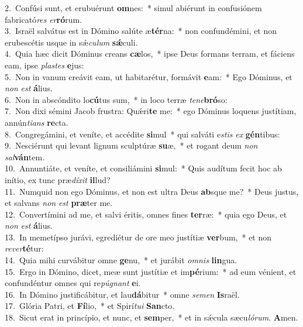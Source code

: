 {2.~}Confúsi sunt, et erubuérunt \textbf{om}nes:~* simul abiérunt in confusiónem fabricató\textit{res} \textit{er}\textbf{ró}rum.\\
{3.~}Israël salvátus est in Dómino salúte æ\textbf{tér}na:~* non confundémini, et non erubescétis usque in sǽ\textit{cu}\textit{lum} \textbf{sǽ}culi.\\
{4.~}Quia hæc dicit Dóminus creans \textbf{cæ}los,~* ipse Deus formans terram, et fáciens eam, ipse \textit{pla}\textit{stes} \textbf{e}jus:\\
{5.~}Non in vanum creávit eam, ut habitarétur, formávit \textbf{e}am:~* Ego Dóminus, et \textit{non} \textit{est} \textbf{á}lius.\\
{6.~}Non in abscóndito lo\textbf{cú}tus sum,~* in loco terræ \textit{te}\textit{ne}\textbf{bró}so:\\
{7.~}Non dixi sémini Jacob frustra: Quǽri\textbf{te} me:~* ego Dóminus loquens justítiam, annún\textit{ti}\textit{ans} \textbf{re}cta.\\
{8.~}Congregámini, et veníte, et accédite \textbf{si}mul~* qui salváti e\textit{stis} \textit{ex} \textbf{gén}tibus:\\
{9.~}Nesciérunt qui levant lignum sculptúræ \textbf{su}æ,~* et rogant deum \textit{non} \textit{sal}\textbf{ván}tem.\\
{10.~}Annuntiáte, et veníte, et consiliámini \textbf{si}mul:~* Quis audítum fecit hoc ab inítio, ex tunc præ\textit{dí}\textit{xit} \textbf{il}lud?\\
{11.~}Numquid non ego Dóminus, et non est ultra Deus \textbf{ab}sque me?~* Deus justus, et salvans \textit{non} \textit{est} \textbf{præ}ter me.\\
{12.~}Convertímini ad me, et salvi éritis, omnes fines \textbf{ter}ræ:~* quia ego Deus, et \textit{non} \textit{est} \textbf{á}lius.\\
{13.~}In memetípso jurávi, egrediétur de ore meo justítiæ \textbf{ver}bum,~* et non \textit{re}\textit{ver}\textbf{té}tur:\\
{14.~}Quia mihi curvábitur omne \textbf{ge}nu,~* et jurábit \textit{om}\textit{nis} \textbf{lin}gua.\\
{15.~}Ergo in Dómino, dicet, meæ sunt justítiæ et im\textbf{pé}rium:~* ad eum vénient, et confundéntur omnes qui re\textit{pú}\textit{gnant} \textbf{e}i.\\
{16.~}In Dómino justificábitur, et lau\textbf{dá}bitur~* omne \textit{se}\textit{men} \textbf{Is}raël.\\
{17.~}Glória Patri, et \textbf{Fí}lio,~* et Spirí\textit{tu}\textit{i} \textbf{San}cto.\\
{18.~}Sicut erat in princípio, et nunc, et \textbf{sem}per,~* et in sǽcula sæcu\textit{ló}\textit{rum}. \textbf{A}men.\\
